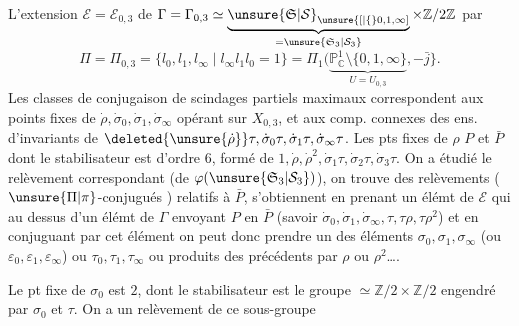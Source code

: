 L'extension $\mathcal E=\mathcal E_{0,3}$ de $\Gamma=\Gamma_{0,3}\simeq\underbrace{\unsure{\mathfrak S|\mathcal S}_{\unsure{[|\{}0,1,\infty]}}_{=\unsure{\mathfrak S_3|\mathcal S_3}}\times\mathbb Z/2\mathbb Z$
par
\[
\Pi=\Pi_{0,3}=\{l_0,l_1,l_\infty\mid l_\infty l_1l_0=1\}=\Pi_1(\underbrace{\mathbb P^1_{\mathbb C}\setminus\{0,1,\infty\}}_{U=U_{0,3}},-\bar j\}.
\]
Les classes de conjugaison  de scindages partiels maximaux correspondent aux points fixes de $\dot\rho,\dot\sigma_0,\dot\sigma_1,\dot\sigma_\infty$ opérant sur $X_{0,3}$, et  aux comp. connexes des ens. d'invariants de $\deleted{\unsure{\dot\rho}}\tau,\dot\sigma_0\tau,\dot\sigma_1\tau,\dot\sigma_\infty\tau$. Les pts fixes de $\rho$  $P$ et $\bar P$ dont le stabilisateur est d'ordre $6$,  formé de $1,\dot\rho,\dot\rho^2,\dot\sigma_1\tau,\dot\sigma_2\tau,\dot\sigma_3\tau$. On a étudié le relèvement correspondant  (de $\varphi(\unsure{\mathfrak S_3|\mathcal S_3})$), on trouve des relèvements ($\unsure{\Pi|\pi}$-conjugués ) relatifs à $\bar P$, s'obtiennent en  prenant un élémt de $\mathcal E$  qui  au dessus d'un élémt de $\Gamma$ envoyant $P$ en $\bar P$ (savoir $\dot\sigma_0,\dot\sigma_1,\dot\sigma_\infty,\tau,\tau\rho,\tau\rho^2$) et en conjuguant par cet élément on peut donc prendre  un des éléments $\sigma_0,\sigma_1,\sigma_\infty$ (ou $\varepsilon_0,\varepsilon_1,\varepsilon_\infty$) ou $\tau_0,\tau_1,\tau_\infty$ ou  produits des précédents par \deleted{\unsure{$\tau$}} $\rho$ ou $\rho^2$\ldots.

Le  pt fixe de $\sigma_0$ est $2$, dont le stabilisateur est le groupe $\simeq\mathbb Z/2\times\mathbb Z/2$ engendré par $\sigma_0$ et $\tau$. On a un relèvement de ce sous-groupe
